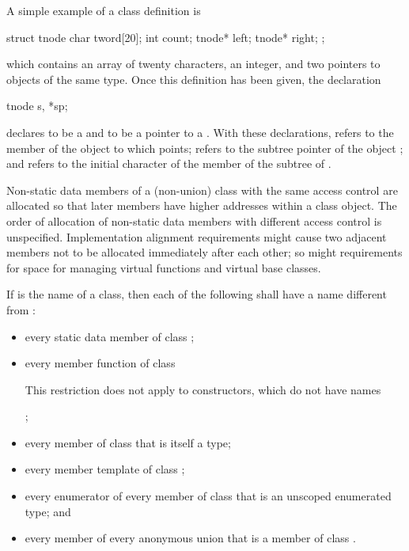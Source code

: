 \pnum
\begin{example}
A simple example of a class definition is

\begin{codeblock}
struct tnode {
  char tword[20];
  int count;
  tnode* left;
  tnode* right;
};
\end{codeblock}

which contains an array of twenty characters, an integer, and two
pointers to objects of the same type. Once this definition has been
given, the declaration

\begin{codeblock}
tnode s, *sp;
\end{codeblock}

declares  to be a  and  to be a pointer
to a . With these declarations,  refers to
the  member of the object to which  points;
 refers to the  subtree pointer of the object
; and  refers to the initial character
of the  member of the  subtree of .
\end{example}

\pnum
{}%
Non-static data members of a (non-union) class
with the same access control
are allocated so that later
members have higher addresses within a class object.
%
The order of allocation of non-static data members
with different access control
is unspecified.
Implementation alignment requirements might cause two adjacent members
not to be allocated immediately after each other; so might requirements
for space for managing virtual functions and
virtual base classes.

\pnum
If  is the name of a class, then each of the following shall
have a name different from :

\begin{itemize}
\item every static data member of class ;

\item every member function of class 
\begin{note}
This restriction does not apply to constructors, which do not have
names
\end{note};

\item every member of class  that is itself a type;

\item every member template of class ;

\item every enumerator of every member of class  that is an
unscoped enumerated type; and

\item every member of every anonymous union that is a member of class
.
\end{itemize}

